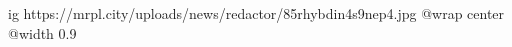  
 
 
 
 

\ifcmt
  ig https://mrpl.city/uploads/news/redactor/85rhybdin4s9nep4.jpg
  @wrap center
  @width 0.9
\fi
